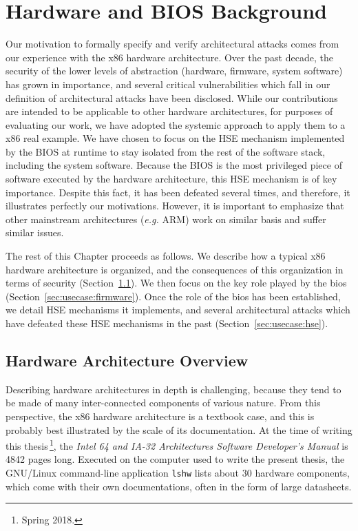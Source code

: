 \chapter{Hardware and BIOS Background}
\label{chapter:usecase}

Our motivation to formally specify and verify architectural attacks comes from
our experience with the x86 hardware architecture.
%
Over the past decade, the security of the lower levels of abstraction (hardware,
firmware, system software) has grown in importance, and several critical
vulnerabilities which fall in our definition of architectural attacks have been
disclosed.
%
While our contributions are intended to be applicable to other hardware
architectures, for purposes of evaluating our work, we have adopted the systemic
approach to apply them to a x86 real example.
%
We have chosen to focus on the HSE mechanism implemented by the BIOS at runtime
to stay isolated from the rest of the software stack, including the system
software.
%
Because the BIOS is the most privileged piece of software executed by the
hardware architecture, this HSE mechanism is of key importance.
%
Despite this fact, it has been defeated several times, and therefore, it
illustrates perfectly our motivations.
%
However, it is important to emphasize that other mainstream architectures
(\emph{e.g.}  ARM) work on similar basis and suffer similar issues.

The rest of this Chapter proceeds as follows.
%
We describe how a typical x86 hardware architecture is organized, and the
consequences of this organization in terms of security
(Section~\ref{sec:usecase:architecture}).
%
We then focus on the key role played by the \ac{bios}
(Section~\ref{sec:usecase:firmware}).
%
Once the role of the \ac{bios} has been established, we detail HSE mechanisms it
implements, and several architectural attacks which have defeated these HSE
mechanisms in the past (Section~\ref{sec:usecase:hse}).

\section{Hardware Architecture Overview}
\label{sec:usecase:architecture}


Describing hardware architectures in depth is challenging, because they tend to
be made of many inter-connected components of various nature.
%
From this perspective, the x86 hardware architecture is a textbook case, and
this is probably best illustrated by the scale of its documentation.
%
At the time of writing this thesis\,\footnote{Spring 2018.}, the \emph{Intel 64
  and IA-32 Architectures Software Developer’s Manual} is 4842 pages long.
%
Executed on the computer used to write the present thesis, the GNU/Linux
command-line application \texttt{lshw} lists about 30 hardware components, which
come with their own documentations, often in the form of large datasheets.

